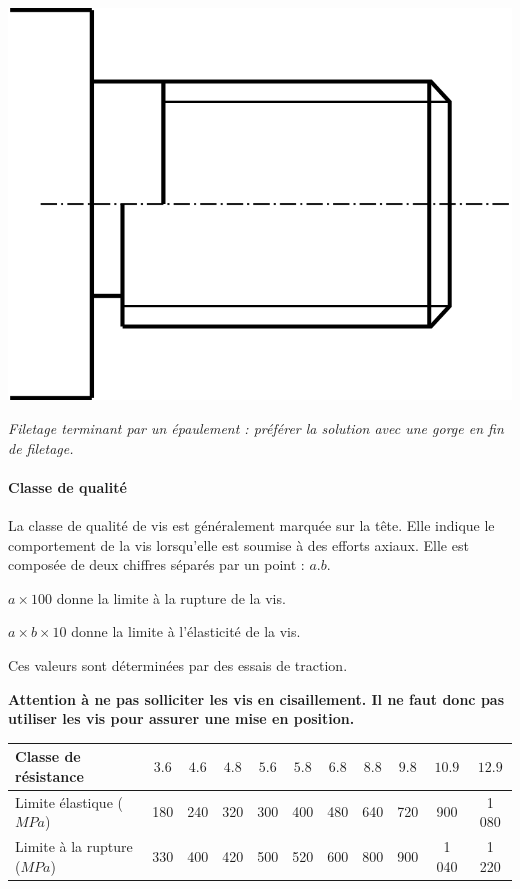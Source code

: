 \documentclass[11pt,oneside]{article}
\begin{document}
\begin{minipage}[c]{.3\linewidth}
\begin{center}
\includegraphics[width=.8\textwidth]{png/epaulement}
\end{center}

\noindent\textit{Filetage terminant par un épaulement : préférer la solution avec une gorge en fin de filetage.}
\end{minipage}


\paragraph*{Classe de qualité}
La classe de qualité de vis est généralement marquée sur la tête. Elle indique le comportement de la vis lorsqu'elle est soumise à des efforts axiaux. Elle est composée de deux chiffres séparés par un point : $a.b$.

$a\times 100$ donne la limite à la rupture de la vis.

$a\times b\times 10$ donne la limite à l'élasticité de la vis. 

Ces valeurs sont déterminées par des essais de traction. 

\textbf{Attention à ne pas solliciter les vis en cisaillement. Il ne faut donc pas utiliser les vis pour assurer une mise en position.}

\begin{center}
\begin{tabular}{|l|c|c|c|c|c|c|c|c|c|c|}
\hline
Classe de résistance & 
$3.6$ & $4.6$ & $4.8$ & $5.6$ & $5.8$ & $6.8$ & $8.8$ & $9.8$ & $10.9$ & $12.9$ \\
\hline 
Limite élastique ($MPa$) & 180 & 240 & 320 & 300 & 400 & 480 & 640 & 720 & 900 & 1 080 \\
\hline
Limite à la rupture  ($MPa$) & 330 & 400 & 420 & 500 & 520 & 600 & 800 & 900 & 1 040 & 1 220 \\
\hline
\end{tabular}
\end{center}
\end{document}

